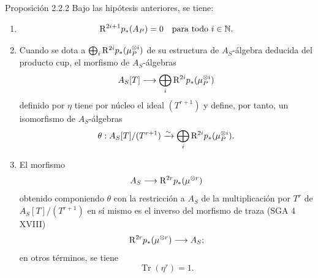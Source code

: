 \begin{statement}{Proposición 2.2.2}
Bajo las hipótesis anteriores, se tiene:
\begin{enumerate}[label=\alph*)]
\item
\[
\mathrm{R}^{2i+1}p_*(A_P)=0\quad\text{para todo }i\in\mathbb N.
\]
\item Cuando se dota a $\bigoplus_i \mathrm{R}^{2i}p_*(\mu_P^{\otimes i})$ de su estructura de $A_S$-álgebra deducida del producto cup, el morfismo de $A_S$-álgebras
\[
A_S[T]\longrightarrow \bigoplus_i \mathrm{R}^{2i}p_*(\mu_P^{\otimes i})
\]
definido por $\eta$ tiene por núcleo el ideal $(T^{r+1})$ y define, por tanto, un isomorfismo de $A_S$-álgebras
\[
\theta:A_S[T]/(T^{r+1})\xrightarrow{\sim}\bigoplus_i \mathrm{R}^{2i}p_*(\mu_P^{\otimes i}).
\]
\item El morfismo
\[
A_S\longrightarrow \mathrm{R}^{2r}p_*(\mu^{\otimes r})
\]
obtenido componiendo $\theta$ con la restricción a $A_S$ de la multiplicación por $T^r$ de $A_S[T]/(T^{r+1})$ en sí mismo es el inverso del morfismo de traza (SGA 4 XVIII)
\[
\mathrm{R}^{2r}p_*(\mu^{\otimes r})\longrightarrow A_S;
\]
en otros términos, se tiene
\[
\operatorname{Tr}(\eta^r)=1.
\]
\end{enumerate}
\end{statement}
